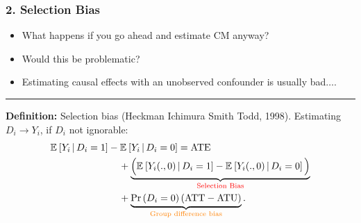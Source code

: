 \documentclass[dvipsnames]{beamer} %
\newcommand{\Prob}[1]{\Pr\left( #1 \right)}                         %
\newcommand{\Egiven}[3][]{\mathbb{E}_{#1} \left[ #2 \, \middle\vert \, #3 \right]} %
\begin{document}
\begin{frame}
    \frametitle{2. Selection Bias}
    \begin{itemize}
        \item What happens if you go ahead and estimate CM anyway?
        \item Would this be problematic?
        \item Estimating causal effects with an unobserved confounder is usually bad$\hdots$.
    \end{itemize}
    \par\noindent\rule{\textwidth}{0.4pt}
    \vskip0.25cm
    \textbf{Definition:} Selection bias (Heckman Ichimura Smith Todd, 1998).
    \vskip0.25cm
    Estimating $D_i \to Y_i$, if $D_i$ not ignorable:
    \begin{align*}
        \Egiven{ Y_i}{D_i =1} &- \Egiven{ Y_i}{D_i =0}
        = \text{ATE} \\
        &\;\;\;\; + \underbrace{\Big(
            \Egiven{ Y_i(., 0)}{D_i =1} - \Egiven{ Y_i(.,0)}{D_i =0} \Big)}_{
                \text{\textcolor{red}{Selection Bias}}} \\
        &\;\;\;\;+ \underbrace{ \Prob{D_i=0} (\text{ATT}- \text{ATU}) }_{
            \text{\textcolor{orange}{Group difference bias}}}.
    \end{align*}
\end{frame}
\end{document}
